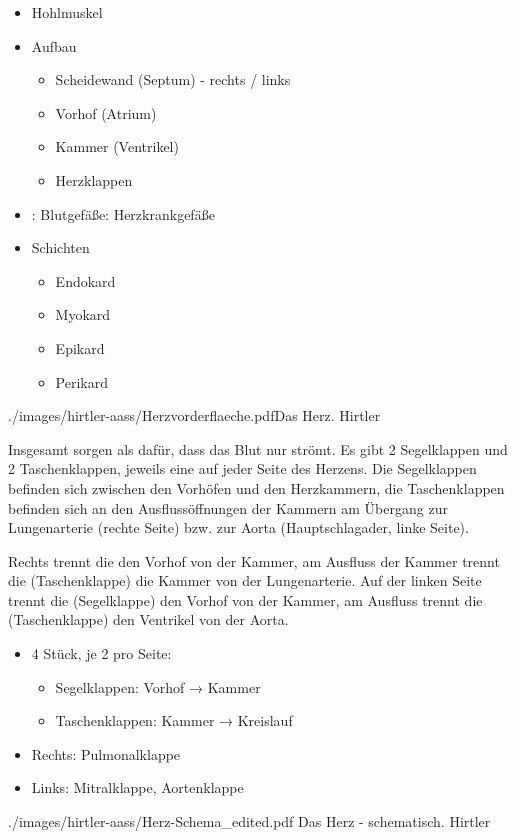{
\begin{itemize}
  \item Hohlmuskel
  \item Aufbau
  \begin{itemize}
    \item Scheidewand (Septum) - rechts / links
    \item Vorhof (Atrium)
    \item Kammer (Ventrikel)
    \item Herzklappen
  \end{itemize}
  \item: Blutgefäße: Herzkrankgefäße
  \item Schichten
  \begin{itemize}
    \item Endokard
    \item Myokard
    \item Epikard
    \item Perikard
  \end{itemize}
\end{itemize}
}
{./images/hirtler-aass/Herzvorderflaeche.pdf}{Das
Herz.}
{Hirtler}


{%
%
%
%
%
% 
Insgesamt   sorgen als 
dafür, dass das Blut nur  strömt. Es
gibt 2 Segelklappen und 2 Taschenklappen, jeweils eine auf
jeder Seite des Herzens. Die Segelklappen befinden sich
zwischen den Vorhöfen und den Herzkammern, die
Taschenklappen befinden sich an den Ausflussöffnungen der
Kammern am Übergang zur Lungenarterie (rechte Seite) bzw.
zur  Aorta (Hauptschlagader, linke Seite).

Rechts trennt die  den
Vorhof von der Kammer, am Ausfluss der Kammer trennt die
 (Taschenklappe) die Kammer von der
Lungenarterie. Auf der linken Seite trennt die
 (Segelklappe) den Vorhof von der Kammer, am
Ausfluss trennt die  (Taschenklappe) den
Ventrikel von der Aorta.
}{
\begin{itemize}
  \item 4 Stück, je 2 pro Seite:\begin{itemize}
    \item Segelklappen: Vorhof → Kammer
    \item Taschenklappen: Kammer → Kreislauf
  \end{itemize}
  \item Rechts:  Pulmonalklappe
  \item Links: Mitralklappe, Aortenklappe
\end{itemize}
}
{./images/hirtler-aass/Herz-Schema_edited.pdf}
{Das Herz - schematisch.}
{Hirtler}

